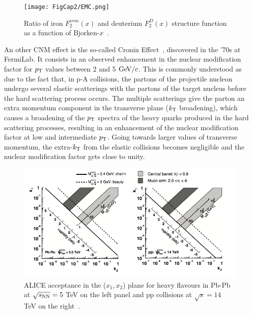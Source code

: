 \begin{figure}[!ht]
  \centering
  \texttt{[image: FigCap2/EMC.png]}
  \caption{Ratio of iron $F^{iron}_2(x)$ and deuterium $F^D_2(x)$ structure function as a function of Bjorken-$x$~\cite{Aubert:1983xm}.%
  }
  \label{fig:EMC}
\end{figure}



An other CNM effect is the so-called Cronin Effect~\cite{Cronin:1974zm}, 
discovered in the '70s at FermiLab. It consists in an observed 
enhancement in the nuclear modification factor for $p_{\rm T}$ 
values between 2 and 5 $\mathrm{GeV}/c$. This is commonly understood as due to 
the fact that, in p-A collisions, the 
partons of the projectile nucleon undergo several elastic 
scatterings with the partons of the target nucleus before the hard scattering process 
occurs. The multiple scatterings give the parton an extra 
momentum component in the transverse plane ($k_{\rm T}$ broadening), 
which causes a broadening of the $p_{\rm T}$ spectra of the heavy 
quarks produced in the hard scattering processes,  
resulting in an enhancement of the nuclear modification factor at 
low and intermediate $p_{\rm T}$. Going towards 
larger values of transverse momentum, the extra-$k_{\rm T}$ 
from the elastic collisions becomes negligible and the nuclear 
modification factor gets close to unity.\\
\begin{figure}[!ht]
  \centering
  \includegraphics[width=15cm]{FigCap2/xBjork.png}
  \caption{ALICE acceptance in the ($x_1, x_2$) plane for heavy flavours in Pb-Pb at $\sqrt{s_{\rm NN}} = 5$ TeV on the left panel and pp collisions at $\sqrt{s} = 14$ TeV on the right~\cite{Alessandro:2006yt}. }
  \label{fig:xBjork}
\end{figure}



